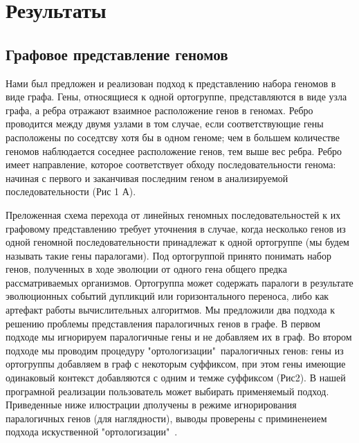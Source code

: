 

\section*{Результаты}

\subsection*{Графовое представление геномов}

Нами был предложен и реализован подход к представлению набора геномов в виде графа. Гены, относящиеся к одной ортогруппе, представляются в виде узла графа, а ребра отражают взаимное расположение генов в геномах. Ребро проводится между двумя узлами в том случае, если соответствующие гены расположены по соседтсву хотя бы в одном геноме; чем в большем количестве геномов наблюдается соседнее расположение генов, тем выше вес ребра. Ребро имеет направление, которое соответствует обходу последовательности генома: начиная с первого и заканчивая последним геном в анализируемой последовательности (Рис 1 А).

Преложенная схема перехода от линейных геномных последовательностей к их графовому представлению требует уточнения в случае, когда несколько генов из одной геномной последовательности принадлежат к одной ортогруппе (мы будем называть такие гены паралогами). Под ортогруппой принято понимать набор генов, полученных в ходе эволюции от одного гена общего предка рассматриваемых организмов. Ортогруппа может содержать паралоги в результате эволюционных событий дупликций или горизонтального переноса, либо как артефакт работы вычислительных алгоритмов. Мы предложили два подхода к решению проблемы представления паралогичных генов в графе. В первом подходе мы игнорируем паралогичные гены и не добавляем их в граф. Во втором подходе мы проводим процедуру "ортологизации"\ паралогичных генов: гены из ортогруппы добавляем в граф с некоторым суффиксом, при этом гены имеющие одинаковый контекст добавляются с одним и темже суффиксом (Рис2). В нашей програмной реализации пользователь может выбирать применяемый подход. Приведенные ниже илюстрации дполучены в режиме игнорирования паралогичных генов (для наглядности), выводы проверены с приминенеием подхода искуственной "ортологизации"\ .  

